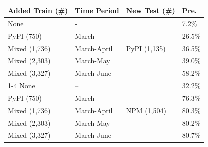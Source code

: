 \begin{table}[t]
    \footnotesize
    \centering
    \caption{}\label{table:result-after-retrain}
    \vspace{-10pt}
    \begin{tabular}{m{2.6cm}m{2.6cm}m{1.6cm}m{1.0cm}}
        \toprule
        Added Train (\#) & Time Period  & New Test (\#)  & Pre.\\\hline
        None &  - & \multirow{5}{*}{PyPI (1,135)} & 7.2\% \\
        PyPI (750) & March &  & 26.5\% \\
        Mixed (1,736) & March-April &  & 36.5\% \\
        Mixed (2,303) & March-May &  & 39.0\% \\
        Mixed (3,327) & March-June &  & 58.2\% \\
        \cline{1-4}
        None & -- & \multirow{5}{*}{NPM (1,504)} & 32.2\%  \\
        PyPI (750) & March &  & 76.3\% \\
        Mixed (1,736) & March-April &  & 80.3\% \\
        Mixed (2,303) & March-May &  & 80.2\% \\
        Mixed (3,327) & March-June &  & 80.7\% \\
        \bottomrule
    \end{tabular}
\end{table}



